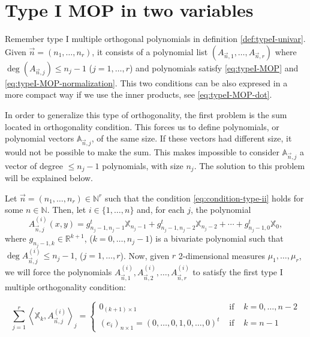 \documentclass[12pt,a4]{article}
\theoremstyle{plain}
\newcommand{\R}[0]{\mathbb{R}}
\newcommand{\N}[0]{\mathbb{N}}
\newcommand{\prodesc}[2]{\left\langle #1 , #2 \right\rangle}
\begin{document}
\section{Type I MOP in two variables}

Remember type I multiple orthogonal polynomials in definition \ref{def:typeI-univar}. Given $\vec n =(n_1,\dots,n_r)$, it consists of a polynomial list $(A_{\vec n,1},\dots,A_{\vec n, r})$ where $\deg(A_{\vec n,j})\leq n_j-1$ ($j=1,\dots,r$) and polynomials satisfy \eqref{eq:typeI-MOP} and \eqref{eq:typeI-MOP-normalization}. This two conditions can be also expresed in a more compact way if we use the inner products, see \eqref{eq:typeI-MOP-dot}.

In order to generalize this type of orthogonality, the first problem is the sum located in orthogonality condition. This forces us to define polynomials, or polynomial vectors $\mathbb A_{\vec n, j}$, of the same size. If these vectors had different size, it would not be possible to make the sum. This makes impossible to consider $\mathbb A_{\vec n,j}$ a vector of degree $\leq n_j-1$ polynomials, with size $n_j$. The solution to this problem will be explained below.

Let $\vec n = (n_1,\dots,n_r)\in\N^r$ such that the condition \eqref{eq:condition-type-ii} holds for some $n\in\N$. Then, let $i\in\{1,\dots,n\}$ and, for each $j$, the polynomial $$A_{\vec n, j}^{(i)}(x,y) = g_{n_j-1,n_j-1}^t \mathbb X_{n_j-1} + g_{n_j-1,n_j-2}^t \mathbb X_{n_j-2} + \cdots + g_{n_j-1,0}^t \mathbb X_{0},$$ where $g_{n_j-1,k}\in\R^{k+1}$, ($k=0,\dots,n_j-1$) is a bivariate polynomial such that $\deg A_{\vec n, j}^{(i)} \leq n_j-1$, ($j=1,\dots,r$). Now, given $r$ 2-dimensional measures $\mu_1,\dots,\mu_r$, we will force the polynomials $A_{\vec n, 1}^{(i)}, A_{\vec n, 2}^{(i)}, \dots, A_{\vec n, r}^{(i)}$ to satisfy the first type I multiple orthogonality condition:

\begin{equation}
    \label{eq:first-condition-type-I}
    \sum_{j=1}^r \prodesc{\mathbb X_k}{A_{\vec n,j}^{(i)}}_j = \left\{\begin{array}{ccl}
        0_{(k+1)\times 1} &   \text{ if } & k=0,\dots,n-2 \\
        (e_i)_{n\times 1} = (0,\dots,0,1,0,\dots,0)^t & \text{ if } & k=n-1      
    \end{array}\right.
\end{equation}
\end{document}
